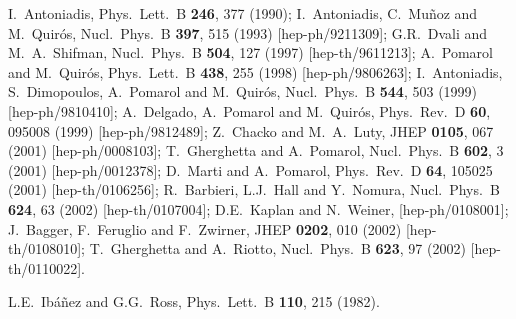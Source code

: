 \documentclass[11pt]{article}
\begin{document}
\begin{thebibliography}{999}
I.~Antoniadis,
  Phys.\ Lett.\ B {\bf 246}, 377 (1990);
I.~Antoniadis, C.~Mu\~noz and M.~Quir\'os,
  Nucl.\ Phys.\ B {\bf 397}, 515 (1993)
  [hep-ph/9211309];
G.R.~Dvali and M.~A.~Shifman,
  Nucl.\ Phys.\ B {\bf 504}, 127 (1997)
  [hep-th/9611213];
A.~Pomarol and M.~Quir\'os,
  Phys.\ Lett.\ B {\bf 438}, 255 (1998)
  [hep-ph/9806263];
I.~Antoniadis, S.~Dimopoulos, A.~Pomarol and M.~Quir\'os,
  Nucl.\ Phys.\ B {\bf 544}, 503 (1999)
  [hep-ph/9810410];
A.~Delgado, A.~Pomarol and M.~Quir\'os,
  Phys.\ Rev.\ D {\bf 60}, 095008 (1999)
  [hep-ph/9812489];
Z.~Chacko and M.~A.~Luty,
  JHEP {\bf 0105}, 067 (2001)
  [hep-ph/0008103];
T.~Gherghetta and A.~Pomarol,
  Nucl.\ Phys.\ B {\bf 602}, 3 (2001)
  [hep-ph/0012378];
D.~Marti and A.~Pomarol,
  Phys.\ Rev.\ D {\bf 64}, 105025 (2001)
  [hep-th/0106256];
R.~Barbieri, L.J.~Hall and Y.~Nomura,
  Nucl.\ Phys.\ B {\bf 624}, 63 (2002)
  [hep-th/0107004];
D.E.~Kaplan and N.~Weiner,
  [hep-ph/0108001];
J.~Bagger, F.~Feruglio and F.~Zwirner,
  JHEP {\bf 0202}, 010 (2002)
  [hep-th/0108010];
T.~Gherghetta and A.~Riotto,
  Nucl.\ Phys.\ B {\bf 623}, 97 (2002)
  [hep-th/0110022].

L.E.~Ib\'a\~nez and G.G.~Ross, 
  Phys.\ Lett.\ B {\bf 110}, 215 (1982).


\end{thebibliography}
\end{document}
